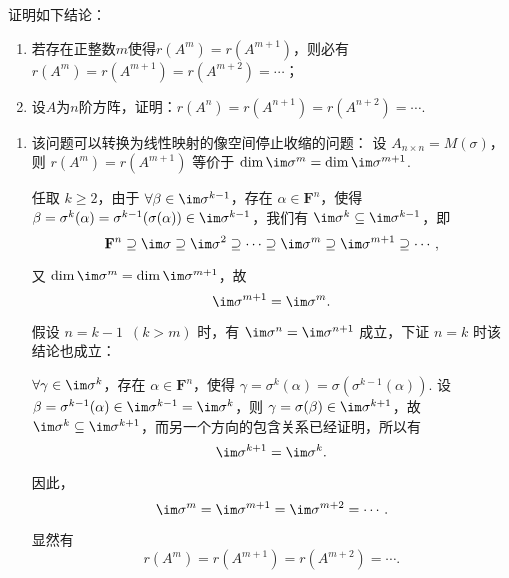 \begin{exercise}
\begin{exgroup}
        \item 证明如下结论：
        \begin{enumerate}
            \item 若存在正整数$m$使得$r(A^m)=r(A^{m+1})$，则必有$r(A^m)=r(A^{m+1})=r(A^{m+2})=\cdots$；
            \item 设$A$为$n$阶方阵，证明：$r(A^n)=r(A^{n+1})=r(A^{n+2})=\cdots$.
        \end{enumerate}
        \begin{answer}
            \begin{enumerate}
                \item 该问题可以转换为线性映射的像空间停止收缩的问题：
                    设 $A_{n \times n} = M(\sigma)$，则 $r(A^m) = r(A^{m+1})$ 等价于 $\dim \im \sigma^m = \dim \im \sigma^{m+1}$.

                    任取 $k \geqslant 2$，由于 $\forall \beta \in \im \sigma^{k-1}$，存在 $\alpha \in \mathbf{F}^n$，使得 $\beta = \sigma^k(\alpha) = \sigma^{k-1}(\sigma(\alpha)) \in \im \sigma^{k-1}$，我们有 $\im \sigma^k \subseteq \im \sigma^{k-1}$，即
                    \[
                        \mathbf{F}^n \supseteq \im \sigma \supseteq \im \sigma^2 \supseteq \cdots \supseteq \im \sigma^m \supseteq \im \sigma^{m+1} \supseteq \cdots,
                    \]

                    又 $\dim \im \sigma^m = \dim \im \sigma^{m+1}$，故
                    \[
                        \im \sigma^{m+1} = \im \sigma^m.
                    \]

                    假设 $n=k-1 \enspace (k > m)$ 时，有 $\im \sigma^n = \im \sigma^{n+1}$ 成立，下证 $n=k$ 时该结论也成立：

                    $\forall \gamma \in \im \sigma^k$，存在 $\alpha \in \mathbf{F}^n$，使得 $\gamma = \sigma^k(\alpha) = \sigma(\sigma^{k-1}(\alpha))$. 设 $\beta = \sigma^{k-1}(\alpha) \in \im \sigma^{k-1} = \im \sigma^k$，则 $\gamma = \sigma(\beta) \in \im \sigma^{k+1}$，故 $\im \sigma^k \subseteq \im \sigma^{k+1}$，而另一个方向的包含关系已经证明，所以有
                    \[
                        \im \sigma^{k+1} = \im \sigma^k.
                    \]

                    因此，
                    \[
                        \im \sigma^m = \im \sigma^{m+1} = \im \sigma^{m+2} = \cdots.
                    \]

                    显然有
                    \[
                        r(A^m) = r(A^{m+1}) = r(A^{m+2}) = \cdots.
                    \]


\end{enumerate}
\end{answer}
\end{exgroup}
\end{exercise}

